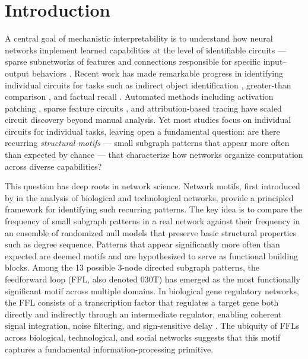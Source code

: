 \section{Introduction}\label{sec:intro}

A central goal of mechanistic interpretability is to understand how neural networks implement learned capabilities at the level of identifiable circuits --- sparse subnetworks of features and connections responsible for specific input--output behaviors \cite{elhage2021mathematical, olsson2022context}. Recent work has made remarkable progress in identifying individual circuits for tasks such as indirect object identification \cite{wang2023interpretability}, greater-than comparison \cite{hanna2023how}, and factual recall \cite{meng2022locating}. Automated methods including activation patching \cite{conmy2023automated}, sparse feature circuits \cite{marks2024sparse}, and attribution-based tracing \cite{templeton2024scaling} have scaled circuit discovery beyond manual analysis. Yet most studies focus on individual circuits for individual tasks, leaving open a fundamental question: are there recurring \emph{structural motifs} --- small subgraph patterns that appear more often than expected by chance --- that characterize how networks organize computation across diverse capabilities?

This question has deep roots in network science. Network motifs, first introduced by \citet{milo2002network} in the analysis of biological and technological networks, provide a principled framework for identifying such recurring patterns. The key idea is to compare the frequency of small subgraph patterns in a real network against their frequency in an ensemble of randomized null models that preserve basic structural properties such as degree sequence. Patterns that appear significantly more often than expected are deemed motifs and are hypothesized to serve as functional building blocks. Among the 13 possible 3-node directed subgraph patterns, the feedforward loop (FFL, also denoted 030T) has emerged as the most functionally significant motif across multiple domains. In biological gene regulatory networks, the FFL consists of a transcription factor that regulates a target gene both directly and indirectly through an intermediate regulator, enabling coherent signal integration, noise filtering, and sign-sensitive delay \cite{alon2007network, mangan2003structure, shenorr2002network}. The ubiquity of FFLs across biological, technological, and social networks \cite{milo2004superfamilies} suggests that this motif captures a fundamental information-processing primitive.

